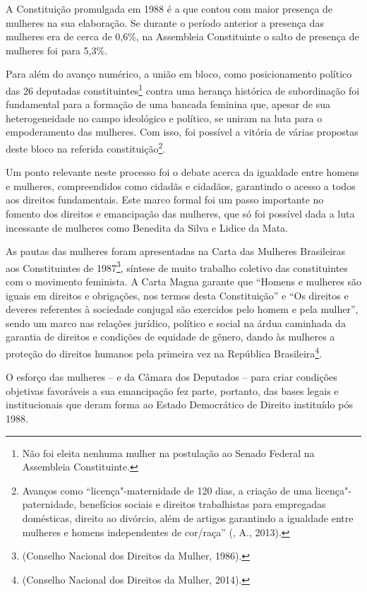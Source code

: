 A Constituição promulgada em 1988 é a que contou com maior presença de
mulheres na sua elaboração. Se durante o período anterior a presença das
mulheres era de cerca de 0,6\%, na Assembleia Constituinte o salto de
presença de mulheres foi para 5,3\%.

Para além do avanço numérico, a união em bloco, como posicionamento
político das 26 deputadas constituintes\footnote{Não foi eleita nenhuma
  mulher na postulação ao Senado Federal na Assembleia Constituinte.}
contra uma herança histórica de subordinação foi fundamental para a
formação de uma bancada feminina que, apesar de sua heterogeneidade no
campo ideológico e político, se uniram na luta para o empoderamento das
mulheres. Com isso, foi possível a vitória de várias propostas deste
bloco na referida constituição\footnote{Avanços como
  ``licença"-maternidade de 120 dias, a criação de uma
  licença"-paternidade, benefícios sociais e direitos trabalhistas para
  empregadas domésticas, direito ao divórcio, além de artigos garantindo
  a igualdade entre mulheres e homens independentes de cor/raça''
  (, A., 2013).}.

Um ponto relevante neste processo foi o debate acerca da igualdade entre
homens e mulheres, compreendidos como cidadãs e cidadãos, garantindo o
acesso a todos aos direitos fundamentais. Este marco formal foi um passo
importante no fomento dos direitos e emancipação das mulheres, que só
foi possível dada a luta incessante de mulheres como Benedita da Silva e
Lidice da Mata.

As pautas das mulheres foram apresentadas na Carta das Mulheres
Brasileiras aos Constituintes de 1987\footnote{(Conselho Nacional dos
  Direitos da Mulher, 1986).}, síntese de muito trabalho coletivo
das constituintes com o movimento feminista. A Carta Magna garante que
``Homens e mulheres são iguais em direitos e obrigações, nos
termos desta Constituição'' e ``Os direitos e deveres referentes à
sociedade conjugal são exercidos pelo homem e pela mulher'', sendo um
marco nas relações jurídico, político e social na árdua caminhada da
garantia de direitos e condições de equidade de gênero, dando às
mulheres a proteção do direitos humanos pela primeira vez na República
Brasileira\footnote{(Conselho Nacional dos Direitos da Mulher, 2014).}.

O esforço das mulheres -- e da Câmara dos Deputados -- para criar
condições objetivas favoráveis a sua emancipação fez parte, portanto,
das bases legais e institucionais que deram forma ao Estado Democrático
de Direito instituído pós 1988.

